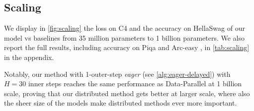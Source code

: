 \subsection{Scaling}

We display in \autoref{fig:scaling} the loss on C4 and the accuracy on HellaSwag \citep{zellers2019hellaswagmachinereallyfinish} of our model vs baselines from 35 million parameters to 1 billion parameters. We also report the full results, including accuracy on Piqa \citep{bisk2019piqareasoningphysicalcommonsense} and Arc-easy \citep{clark2018arc}, in \autoref{tab:scaling} in the appendix.

Notably, our method with 1-outer-step \textit{eager} (see \autoref{alg:eager-delayed}) with $H=30$ inner steps reaches the same performance as Data-Parallel at 1 billion scale, proving that our distributed method gets better at larger scale, where also the sheer size of the models make distributed methods ever more important. 


